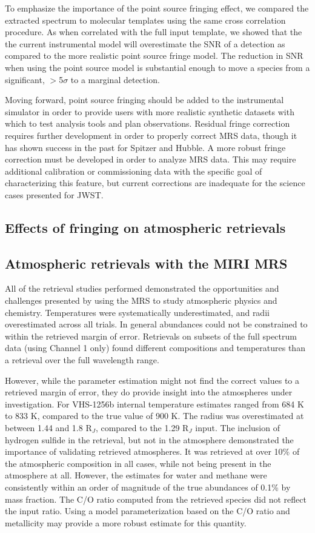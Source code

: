 To emphasize the importance of the point source fringing effect, we compared the extracted spectrum to molecular templates using the same cross correlation procedure.
As when correlated with the full input template, we showed that the the current instrumental model will overestimate the SNR of a detection as compared to the more realistic point source fringe model. 
The reduction in SNR when using the point source model is substantial enough to move a species from a significant, $>$5$\sigma$ to a marginal detection.

Moving forward, point source fringing should be added to the instrumental simulator in order to provide users with more realistic synthetic datasets with which to test analysis tools and plan observations. 
Residual fringe correction requires further development in order to properly correct MRS data, though it has shown success in the past for Spitzer and Hubble.
A more robust fringe correction must be developed in order to analyze MRS data.
This may require additional calibration or commissioning data with the specific goal of characterizing this feature, but current corrections are inadequate for the science cases presented for JWST.

\subsection{Effects of fringing on atmospheric retrievals}
\subsection{Atmospheric retrievals with the MIRI MRS}
All of the retrieval studies performed demonstrated the opportunities and challenges presented by using the MRS to study atmospheric physics and chemistry.
Temperatures were systematically underestimated, and radii overestimated across all trials.
In general abundances could not be constrained to within the retrieved margin of error.
Retrievals on subsets of the full spectrum data (using Channel 1 only) found different compositions and temperatures than a retrieval over the full wavelength range.

However, while the parameter estimation might not find the correct values to a retrieved margin of error, they do provide insight into the atmospheres under investigation.
For VHS-1256b internal temperature estimates ranged from 684 K to 833 K, compared to the true value of 900 K. 
The radius was overestimated at between 1.44 and 1.8 R$_{J}$, compared to the 1.29 R$_{J}$ input.
The inclusion of hydrogen sulfide in the retrieval, but not in the atmosphere demonstrated the importance of validating retrieved atmospheres. 
It was retrieved at over 10\% of the atmospheric composition in all cases, while not being present in the atmosphere at all.
However, the estimates for water and methane were consistently within an order of magnitude of the true abundances of 0.1\% by mass fraction.
The C/O ratio computed from the retrieved species did not reflect the input ratio.
Using a model parameterization based on the C/O ratio and metallicity may provide a more robust estimate for this quantity.

